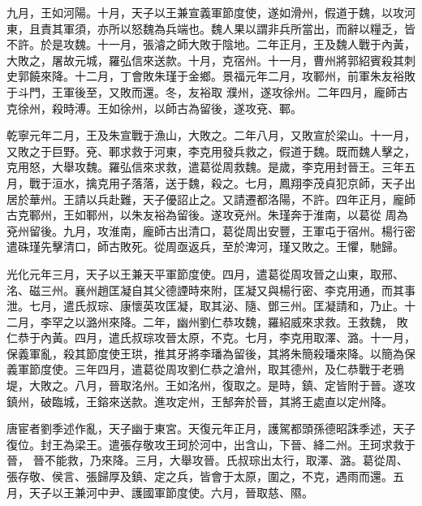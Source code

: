 \begin{pinyinscope}
 九月，王如河陽。十月，天子以王兼宣義軍節度使，遂如滑州，假道于魏，以攻河東，且責其軍須，亦所以怒魏為兵端也。魏人果以謂非兵所當出，而辭以糧乏，皆不許。於是攻魏。十一月，張濬之師大敗于陰地。二年正月，王及魏人戰于內黃，大敗之，屠故元城，羅弘信來送款。十月，克宿州。十一月，曹州將郭紹賓殺其刺史郭饒來降。十二月，丁會敗朱瑾于金鄉。景福元年二月，攻鄆州，前軍朱友裕敗于斗門，王軍後至，又敗而還。冬，友裕取
 濮州，遂攻徐州。二年四月，龐師古克徐州，殺時溥。王如徐州，以師古為留後，遂攻兗、鄆。



 乾寧元年二月，王及朱宣戰于漁山，大敗之。二年八月，又敗宣於梁山。十一月，又敗之于巨野。兗、鄆求救于河東，李克用發兵救之，假道于魏。既而魏人擊之，克用怒，大舉攻魏。羅弘信來求救，遣葛從周救魏。是歲，李克用封晉王。三年五月，戰于洹水，擒克用子落落，送于魏，殺之。七月，鳳翔李茂貞犯京師，天子出居於華州。王請以兵赴難，天子優詔止之。又請遷都洛陽，不許。四年正月，龐師古克鄆州，王如鄆州，以朱友裕為留後。遂攻兗州。朱瑾奔于淮南，以葛從
 周為兗州留後。九月，攻淮南，龐師古出清口，葛從周出安豐，王軍屯于宿州。楊行密遣硃瑾先擊清口，師古敗死。從周亟返兵，至於渒河，瑾又敗之。王懼，馳歸。



 光化元年三月，天子以王兼天平軍節度使。四月，遣葛從周攻晉之山東，取邢、洺、磁三州。襄州趙匡凝自其父德諲時來附，匡凝又與楊行密、李克用通，而其事泄。七月，遣氏叔琮、康懷英攻匡凝，取其泌、隨、鄧三州。匡凝請和，乃止。十二月，李罕之以潞州來降。二年，幽州劉仁恭攻魏，羅紹威來求救。王救魏，
 敗仁恭于內黃。四月，遣氏叔琮攻晉太原，不克。七月，李克用取澤、潞。十一月，保義軍亂，殺其節度使王珙，推其牙將李璠為留後，其將朱簡殺璠來降。以簡為保義軍節度使。三年四月，遣葛從周攻劉仁恭之滄州，取其德州，及仁恭戰于老鴉堤，大敗之。八月，晉取洺州。王如洺州，復取之。是時，鎮、定皆附于晉。遂攻鎮州，破臨城，王鎔來送款。進攻定州，王郜奔於晉，其將王處直以定州降。



 唐宦者劉季述作亂，天子幽于東宮。天復元年正月，護駕都頭孫德昭誅季述，天子復位。封王為梁王。遣張存敬攻王珂於河中，出含山，下晉、絳二州。王珂求救于晉，
 晉不能救，乃來降。三月，大舉攻晉。氏叔琮出太行，取澤、潞。葛從周、張存敬、侯言、張歸厚及鎮、定之兵，皆會于太原，圍之，不克，遇雨而還。五月，天子以王兼河中尹、護國軍節度使。六月，晉取慈、隰。




\end{pinyinscope}
